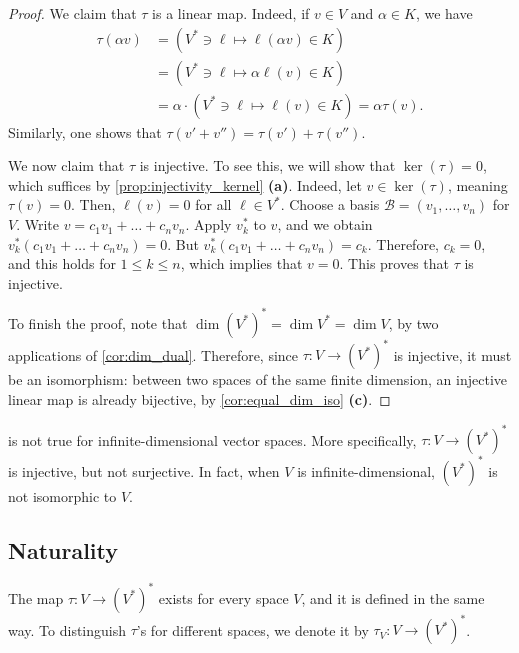 \begin{proof}
  We claim that $\tau$ is a linear map. Indeed, if $v \in V$ and $\alpha \in K$, we have
  \begin{align*}
    \tau(\alpha v) &= (V^* \ni \ell \mapsto \ell(\alpha v) \in K) \\
    &= (V^* \ni \ell \mapsto \alpha \ell(v) \in K) \\
    &= \alpha \cdot (V^* \ni \ell \mapsto \ell(v) \in K) = \alpha \tau(v).
  \end{align*}
  Similarly, one shows that $\tau(v' + v'') = \tau(v') + \tau(v'')$.

  We now claim that $\tau$ is injective. To see this, we will show that $\ker(\tau) = 0$, which suffices by \cref{prop:injectivity_kernel} \textbf{(a)}. Indeed, let $v \in \ker(\tau)$, meaning $\tau(v) = 0$. Then, $\ell(v) = 0$ for all $\ell \in V^*$. Choose a basis $\mathcal{B} = (v_1, \dots, v_n)$ for $V$. Write $v = c_1 v_1 + \dots + c_n v_n$. Apply $v_k^*$ to $v$, and we obtain $v_k^*(c_1 v_1 + \dots + c_n v_n) = 0$. But $v_k^*(c_1 v_1 + \dots + c_n v_n) = c_k$. Therefore, $c_k = 0$, and this holds for $1 \leq k \leq n$, which implies that $v = 0$. This proves that $\tau$ is injective.

  To finish the proof, note that $\dim(V^*)^* = \dim V^* = \dim V$, by two applications of \cref{cor:dim_dual}. Therefore, since $\tau \colon V \to (V^*)^*$ is injective, it must be an isomorphism: between two spaces of the same finite dimension, an injective linear map is already bijective, by \cref{cor:equal_dim_iso} \textbf{(c)}.
\end{proof}

\begin{remark}
   is not true for infinite-di\-men\-sional vector spaces. More specifically, $\tau \colon V \to (V^*)^*$ is injective, but not surjective. In fact, when $V$ is infinite-di\-men\-sional, $(V^*)^*$ is not isomorphic to $V$.
\end{remark}

\subsection{Naturality}
The map $\tau \colon V \to (V^*)^*$ exists for every space $V$, and it is defined in the same way. To distinguish $\tau$'s for different spaces, we denote it by $\tau_V \colon V \to (V^*)^*$.


